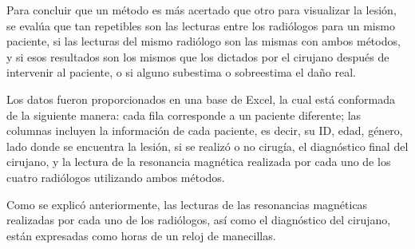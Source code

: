 \documentclass[11pt]{book}
\newcommand{\forceindent}{\leavevmode{\parindent=2em\indent}} %
\begin{document}
			\forceindent Para concluir que un método es más acertado que otro para visualizar la lesión, se evalúa que tan repetibles son las lecturas entre los radiólogos para un mismo paciente, si las lecturas del mismo radiólogo son las mismas con ambos métodos, y si esos resultados son los mismos que los dictados por el cirujano después de intervenir al paciente, o si alguno subestima o sobreestima el daño real.
			
			
			
			
			
			
			\forceindent Los datos fueron proporcionados en una base de Excel, la cual está conformada de la siguiente manera: cada fila corresponde a un paciente diferente; las columnas incluyen la información de cada paciente, es decir, su ID, edad, género, lado donde se encuentra la lesión, si se realizó o no cirugía, el diagnóstico final del cirujano, y la lectura de la resonancia magnética realizada por cada uno de los cuatro radiólogos utilizando ambos métodos. %
			
			\forceindent Como se explicó anteriormente, las lecturas de las resonancias magnéticas realizadas por cada uno de los radiólogos, así como el diagnóstico del cirujano, están expresadas como horas de un reloj de manecillas.  
			
			
\end{document}
